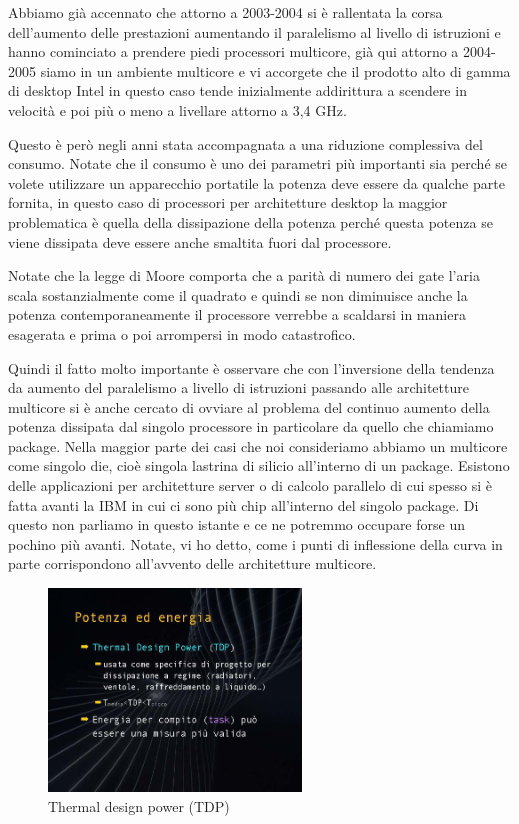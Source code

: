 Abbiamo già accennato che attorno a 2003-2004 si è rallentata la corsa dell'aumento delle prestazioni aumentando il paralelismo al livello di istruzioni e hanno cominciato a prendere piedi processori multicore, già qui attorno a 2004-2005 siamo in un ambiente multicore e vi accorgete che il prodotto alto di gamma di desktop Intel in questo caso tende inizialmente addirittura a scendere in velocità e poi più o meno a livellare attorno a 3,4 GHz.

Questo è però negli anni stata accompagnata a una riduzione complessiva del consumo.
Notate che il consumo è uno dei parametri più importanti sia perché se volete utilizzare un apparecchio portatile la potenza deve essere da qualche parte fornita, in questo caso di processori per architetture desktop la maggior problematica è quella della dissipazione della potenza perché questa potenza se viene dissipata deve essere anche smaltita fuori dal processore.

Notate che la legge di Moore comporta che a parità di numero dei gate l'aria scala sostanzialmente come il quadrato e quindi se non diminuisce anche la potenza contemporaneamente il processore verrebbe a scaldarsi in maniera esagerata e prima o poi arrompersi in modo catastrofico.

Quindi il fatto molto importante è osservare che con l'inversione della tendenza da aumento del paralelismo a livello di istruzioni passando alle architetture multicore si è anche cercato di ovviare al problema del continuo aumento della potenza dissipata dal singolo processore in particolare da quello che chiamiamo package.
Nella maggior parte dei casi che noi consideriamo abbiamo un multicore come singolo die, cioè singola lastrina di silicio all'interno di un package.
Esistono delle applicazioni per architetture server o di calcolo parallelo di cui spesso si è fatta avanti la IBM in cui ci sono più chip all'interno del singolo package.
Di questo non parliamo in questo istante e ce ne potremmo occupare forse un pochino più avanti.
Notate, vi ho detto, come i punti di inflessione della curva in parte corrispondono all'avvento delle architetture multicore.

\begin{figure}[H]
  \centering
  \includegraphics[width=0.6\textwidth,
                    trim=50 110 45 100, %
                    clip]{images/Lez02_p01_fig_05.png}
  \caption{Thermal design power (TDP)}
  \label{fig:Lez02_p01_fig_05}
\end{figure}

